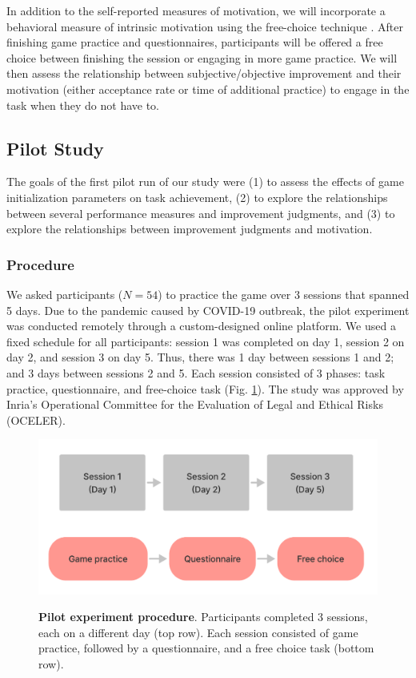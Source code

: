 In addition to the self-reported measures of motivation, we will incorporate a behavioral measure of intrinsic motivation using the free-choice technique \cite{ryan_self-determination_2000}. After finishing game practice and questionnaires, participants will be offered a free choice between finishing the session or engaging in more game practice. We will then assess the relationship between subjective/objective improvement and their motivation (either acceptance rate or time of additional practice) to engage in the task when they do not have to. 

\subsection{Pilot Study}\label{subsec:pilot}

The goals of the first pilot run of our study were (1) to assess the effects of game initialization parameters on task achievement, (2) to explore the relationships between several performance measures and improvement judgments, and (3) to explore the relationships between improvement judgments and motivation.

\subsubsection{Procedure} 
We asked participants ($N=54$) to practice the game over 3 sessions that spanned 5 days. Due to the pandemic caused by COVID-19 outbreak, the pilot experiment was conducted remotely through a custom-designed online platform. We used a fixed schedule for all participants: session 1 was completed on day 1, session 2 on day 2, and session 3 on day 5. Thus, there was 1 day between sessions 1 and 2; and 3 days between sessions 2 and 5. Each session consisted of 3 phases: task practice, questionnaire, and free-choice task (Fig. \ref{fig:5-procedure}). The study was approved by Inria's Operational Committee for the Evaluation of Legal and Ethical Risks (OCELER).

\begin{figure}[bth]
    \centering
    {\includegraphics[width=\linewidth]{Figures/c5/procedure.pdf}}
    \caption[]{\textbf{Pilot experiment procedure}. Participants completed 3 sessions, each on a different day (top row). Each session consisted of game practice, followed by a questionnaire, and a free choice task (bottom row).}\label{fig:5-procedure}
\end{figure}


